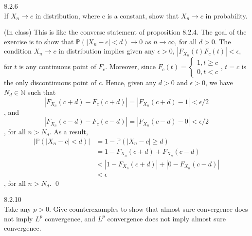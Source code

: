 \begin{exercise}8.2.6 \\
If $X_n \to c$ in distribution, where c is a constant, show that $X_n \to c$ in probability.
\end{exercise}

\begin{answer}(In class)
This is like the converse statement of proposition 8.2.4. The goal of the exercise is to show that $\mathbb{P}(|X_n - c| < d) \to 0$ as $n \to \infty$, for all $d > 0$.
The condition $X_{n} \to c$ in distribution implies given any $\epsilon > 0$, $|F_{X_n}(t) F_c(t)| < \epsilon$, for  $t$ is any continuous point of $F_c$. Moreover, since $F_c(t)= \begin{cases}1, t \geq c \\ 0, t < c \end{cases}$, $t=c$ is the only discontinuous point of $c$. Hence, given any $d > 0$ and $\epsilon > 0$, we have $N_d \in \mathbb{N}$ such that $$|F_{X_n}(c+d)-F_c(c+d)| = |F_{X_n}(c+d) -1| < \epsilon/2$$, and $$|F_{X_n}(c-d)-F_c(c-d)| = |F_{X_n}(c-d) -0| < \epsilon/2$$, for all $n > N_d$. As a result, 
\begin{equation}
    \begin{aligned}
    \left| \mathbb{P}(|X_n - c| < d) \right| &= 1 - \mathbb{P}(|X_n - c| \geq d) \\&= 1 - F_{X_n}(c+d) + F_{X_n}(c-d) \\&< |1 - F_{X_n}(c+d)| + | 0 - F_{X_n}(c-d)| \\&< \epsilon
    \end{aligned}
\end{equation}
, for all $n > N_d$.
\qquad \qed
\end{answer}


\begin{exercise}8.2.10 \\
Take any $p> 0$. Give counterexamples to show that almost sure convergence does not imply $L^p$ convergence, and $L^p$ convergence does not imply almost sure convergence.
\end{exercise}


